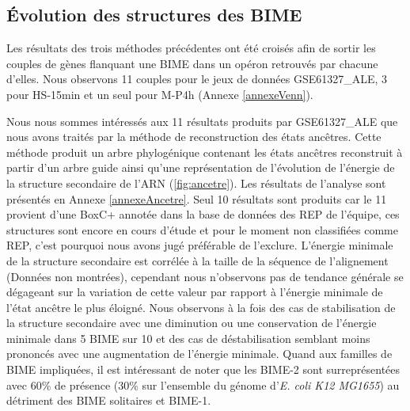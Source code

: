 \documentclass[12pt,a4paper]{report}
\begin{document}
\begin{onehalfspace}
\section*{Évolution des structures des BIME}
Les résultats des trois méthodes précédentes ont été croisés afin de sortir les couples de gènes flanquant une BIME dans un opéron retrouvés par chacune d'elles. Nous observons 11 couples pour le jeux de données GSE61327\_ALE, 3 pour HS-15min et un seul pour M-P4h (Annexe \ref{annexeVenn}). 

Nous nous sommes intéressés aux 11 résultats produits par GSE61327\_ALE que nous avons traités par la méthode de reconstruction des états ancêtres. Cette méthode produit un arbre phylogénique contenant les états ancêtres reconstruit à partir d'un arbre guide ainsi qu'une représentation de l'évolution de l'énergie de la structure secondaire de l'ARN (\autoref{fig:ancetre}). Les résultats de l'analyse sont présentés en Annexe \ref{annexeAncetre}. Seul 10 résultats sont produits car le 11 provient d'une BoxC+ annotée dans la base de données des REP de l'équipe, ces structures sont encore en cours d'étude et pour le moment non classifiées comme REP, c'est pourquoi nous avons jugé préférable de l'exclure. L'énergie minimale de la structure secondaire est corrélée à la taille de la séquence de l'alignement (Données non montrées), cependant nous n'observons pas de tendance générale se dégageant sur la variation de cette valeur par rapport à l'énergie minimale de l'état ancêtre le plus éloigné. Nous observons à la fois des cas de stabilisation de la structure secondaire avec une diminution ou une conservation de l'énergie minimale dans 5 BIME sur 10 et des cas de déstabilisation semblant moins prononcés avec une augmentation de l'énergie minimale. Quand aux familles de BIME impliquées, il est intéressant de noter que les BIME-2 sont surreprésentées avec 60\% de présence (30\% sur l'ensemble du génome d'\textit{E. coli K12 MG1655}) au détriment des BIME solitaires et BIME-1.


\end{onehalfspace}
\end{document}

